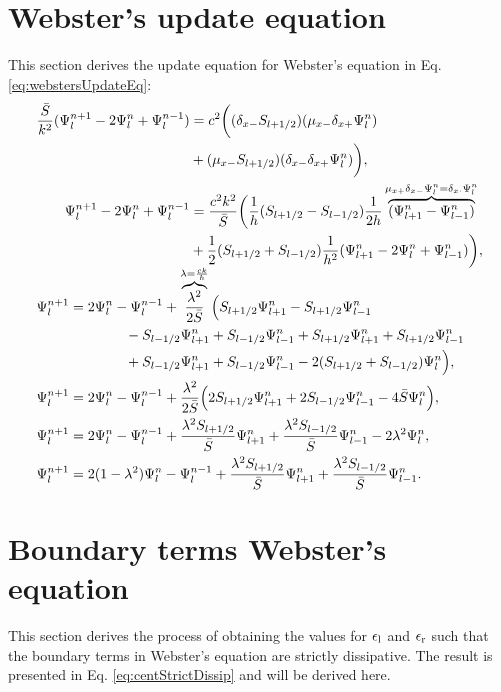 \section{Webster's update equation}\label{app:webstersUpdateEq}
This section derives the update equation for Webster's equation in Eq. \eqref{eq:webstersUpdateEq}:
\begin{align*}
    &\begin{aligned}
    \frac{\bar{S}}{k^2}(\Psi_l^{n+1} - 2\Psi_l^n+\Psi_l^{n-1}) &= c^2\bigg((\delta_{x-} S_{l+1/2})(\mu_{x-} \delta_{x+} \Psi_l^n)\\
    & + (\mu_{x-} S_{l+1/2})(\delta_{x-} \delta_{x+} \Psi_l^n)\bigg),\\
    \Psi_l^{n+1} - 2\Psi_l^n+\Psi_l^{n-1} &= \frac{c^2k^2}{\bar{S}}\bigg(\frac{1}{h}(S_{l+1/2} - S_{l-1/2})\frac{1}{2h}\overbrace{(\Psi_{l+1}^n -\Psi_{l-1}^n)}^{\mu_{x+}\delta_{x-}\Psi_l^n = \delta_{x\cdot}\Psi_l^n}\nonumber\\
    &+\frac{1}{2}(S_{l+1/2} + S_{l-1/2})\frac{1}{h^2}(\Psi_{l+1}^n-2\Psi_l^n+\Psi_{l-1}^n)\bigg),
    \end{aligned}\\[-0.5em]
    &\begin{aligned}
        \Psi_l^{n+1} &= 2\Psi_l^n -\Psi_l^{n-1} +\overbrace{\frac{\lambda^2}{2\bar{S}}}^{\lambda = \frac{ck}{h}}\Big(S_{l+1/2}\Psi_{l+1}^n - S_{l+1/2}\Psi_{l-1}^n\\
        &\qquad\qquad - S_{l-1/2}\Psi_{l+1}^n + S_{l-1/2}\Psi_{l-1}^n+ S_{l+1/2}\Psi_{l+1}^n + S_{l+1/2}\Psi_{l-1}^n \\
        &\qquad\qquad + S_{l-1/2}\Psi_{l+1}^n + S_{l-1/2}\Psi_{l-1}^n - 2 (S_{l+1/2} + S_{l-1/2})\Psi_l^n\Big)\nonumber,\\
        \Psi_l^{n+1} &= 2\Psi_l^n-\Psi_l^{n-1}+ \frac{\lambda^2}{2\bar{S}}\Big(2S_{l+1/2}\Psi_{l+1}^n + 2S_{l-1/2}\Psi_{l-1}^n - 4\bar{S}\Psi_l^n\Big)\nonumber,\\
        \Psi_l^{n+1} &= 2\Psi_l^n-\Psi_l^{n-1}+ \frac{\lambda^2S_{l+1/2}}{\bar{S}}\Psi_{l+1}^n + \frac{\lambda^2S_{l-1/2}}{\bar{S}}\Psi_{l-1}^n - 2\lambda^2\Psi_l^n\nonumber,\\
        \Psi_l^{n+1} &= 2(1-\lambda^2)\Psi_l^n-\Psi_l^{n-1}+ \frac{\lambda^2S_{l+1/2}}{\bar{S}}\Psi_{l+1}^n + \frac{\lambda^2S_{l-1/2}}{\bar{S}}\Psi_{l-1}^n.
    \end{aligned}
\end{align*}

\section{Boundary terms Webster's equation}\label{app:boundaryWebster}
This section derives the process of obtaining the values for $\epsilon_\text{l}$ and $\epsilon_\text{r}$ such that the boundary terms in Webster's equation are strictly dissipative. The result is presented in Eq. \eqref{eq:centStrictDissip} and will be derived here.

